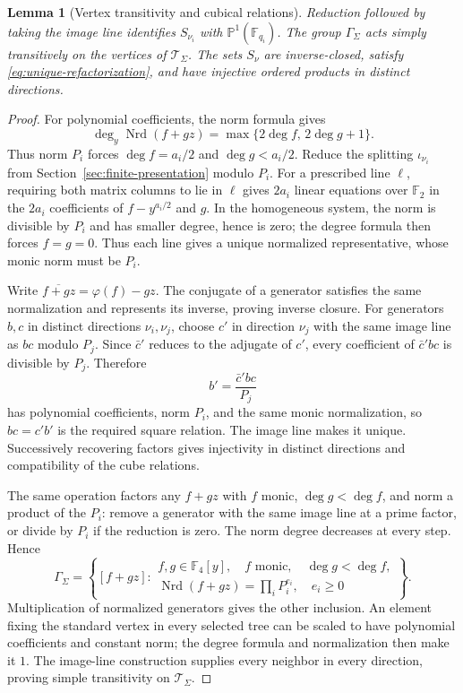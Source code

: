 \documentclass[11pt,letterpaper]{article}
\renewcommand{\ge}{\geqslant}
\newtheorem{lemma}[theorem]{Lemma}
\theoremstyle{definition}
\theoremstyle{remark}
\newcommand{\F}{\mathbb F}
\newcommand{\PP}{\mathbb P}
\newcommand{\Nrd}{\operatorname{Nrd}}
\begin{document}
\begin{lemma}[Vertex transitivity and cubical relations]
\label{lem:cubical-generators}
Reduction followed by taking the image line identifies
$S_{\nu_i}$ with $\PP^1(\F_{q_i})$. The group $\Gamma_\Sigma$
acts simply transitively on the vertices of $\mathcal T_\Sigma$.
The sets $S_\nu$ are inverse-closed, satisfy
\eqref{eq:unique-refactorization}, and have injective ordered
products in distinct directions.
\end{lemma}
\begin{proof}
For polynomial coefficients, the norm formula gives
\[
 \deg_y\Nrd(f+gz)=\max\{2\deg f,\,2\deg g+1\}.
\]
Thus norm $P_i$ forces $\deg f=a_i/2$ and $\deg g<a_i/2$.
Reduce the splitting $\iota_{\nu_i}$ from
Section~\ref{sec:finite-presentation} modulo $P_i$.
For a prescribed line $\ell$, requiring both matrix columns to lie in
$\ell$ gives $2a_i$ linear equations over $\F_2$ in the $2a_i$
coefficients of $f-y^{a_i/2}$ and $g$.
In the homogeneous system, the norm is divisible by $P_i$ and
has smaller degree, hence is zero; the degree formula then forces
$f=g=0$. Thus each line gives a unique normalized representative,
whose monic norm must be $P_i$.

Write $\overline{f+gz}=\varphi(f)-gz$. The conjugate of a
generator satisfies the same normalization and represents its
inverse, proving inverse closure. For generators $b,c$ in
distinct directions $\nu_i,\nu_j$, choose $c'$ in direction
$\nu_j$ with the same image line as $bc$ modulo $P_j$.
Since $\bar c'$ reduces to the adjugate of $c'$, every coefficient
of $\bar c'bc$ is divisible by $P_j$. Therefore
\[
 b'=\frac{\bar c'bc}{P_j}
\]
has polynomial coefficients, norm $P_i$, and the same monic
normalization, so $bc=c'b'$ is the required square relation.
The image line makes it unique. Successively recovering factors
gives injectivity in distinct directions and compatibility
of the cube relations.

The same operation factors any $f+gz$ with $f$ monic,
$\deg g<\deg f$, and norm a product of the $P_i$: remove a
generator with the same image line at a prime factor, or divide
by $P_i$ if the reduction is zero. The norm degree decreases
at every step. Hence
\begin{equation}
 \Gamma_\Sigma=\left\{[f+gz]:
 \begin{array}{l}
 f,g\in\F_4[y],\quad f\text{ monic},\quad\deg g<\deg f,\\
 \Nrd(f+gz)=\prod_iP_i^{e_i},\quad e_i\ge0
 \end{array}\right\}.
 \label{eq:arithmetic-membership}
\end{equation}
Multiplication of normalized generators gives the other inclusion.
An element fixing the standard vertex in every selected tree
can be scaled to have polynomial coefficients and constant norm;
the degree formula and normalization then make it $1$.
The image-line construction supplies every neighbor in every
direction, proving simple transitivity on $\mathcal T_\Sigma$.
\end{proof}
\end{document}

